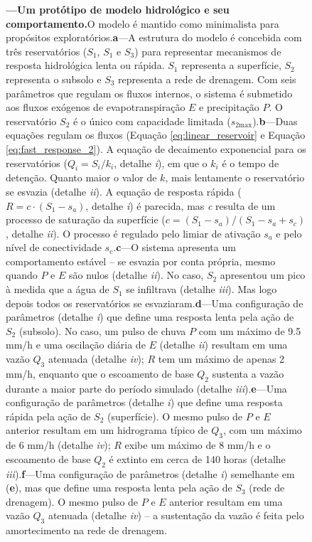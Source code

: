 \documentclass[./main.tex]{subfiles}
\begin{document}
\begin{figure}[t!]
	{\textbf{---\;Um protótipo de modelo hidrológico e seu comportamento.}\;O modelo é mantido como minimalista para propósitos exploratórios.\;\textbf{a}\;---\;A estrutura do modelo é concebida com três reservatórios ($S_1$, $S_1$ e $S_3$) para representar mecanismos de resposta hidrológica lenta ou rápida. $S_1$ representa a superfície, $S_2$ representa o subsolo e $S_3$ representa a rede de drenagem. Com seis parâmetros que regulam os fluxos internos, o sistema é submetido aos fluxos exógenos de evapotranspiração $E$ e precipitação $P$. O reservatório $S_2$ é o único com capacidade limitada ($s_\text{2max}$).\;\textbf{b}\;---\;Duas equações regulam os fluxos (Equação \eqref{eq:linear_reservoir} e Equação \eqref{eq:fast_response_2}). A equação de decaimento exponencial para os reservatórios ($Q_i = S_i/k_i$, detalhe \textrm{\textit{i}}), em que o $k_i$ é o tempo de detenção. Quanto maior o valor de $k$, mais lentamente o reservatório se esvazia (detalhe \textrm{\textit{ii}}). A equação de resposta rápida ($R = c\cdot (S_1 - s_a)$, detalhe \textrm{\textit{i}}) é parecida, mas \textit{c} resulta de um processo de saturação da superfície ($c = (S_1 - s_a)/(S_1 - s_a + s_c)$, detalhe \textrm{\textit{ii}}). O processo é regulado pelo limiar de ativação $s_a$ e pelo nível de conectividade $s_c$.\;\textbf{c}\;---\;O sistema apresenta um comportamento estável -- se esvazia por conta própria, mesmo quando $P$ e $E$ são nulos (detalhe \textrm{\textit{ii}}). No caso, $S_2$ apresentou um pico à medida que a água de $S_1$ se infiltrava (detalhe \textrm{\textit{iii}}). Mas logo depois todos os reservatórios se esvaziaram.\;\textbf{d}\;---\;Uma configuração de parâmetros (detalhe \textrm{\textit{i}}) que define uma resposta lenta pela ação de $S_2$ (subsolo). No caso, um pulso de chuva $P$ com um máximo de 9.5 mm/h e uma oscilação diária de $E$ (detalhe \textrm{\textit{ii}}) resultam em uma vazão $Q_3$ atenuada (detalhe \textrm{\textit{iv}}); $R$ tem um máximo de apenas 2 mm/h, enquanto que o escoamento de base $Q_2$ sustenta a vazão durante a maior parte do período simulado (detalhe \textrm{\textit{iii}}).\;\textbf{e}\;---\;Uma configuração de parâmetros (detalhe \textrm{\textit{i}}) que define uma resposta rápida pela ação de $S_2$ (superfície). O mesmo pulso de $P$ e $E$ anterior resultam em um hidrograma típico de $Q_3$, com um máximo de 6 mm/h (detalhe \textrm{\textit{iv}}); $R$ exibe um máximo de 8 mm/h e o escoamento de base $Q_2$ é extinto em cerca de 140 horas (detalhe \textrm{\textit{iii}}).\;\textbf{f}\;---\;Uma configuração de parâmetros (detalhe \textrm{\textit{i}}) semelhante em (\textbf{e}), mas que define uma resposta lenta pela ação de $S_3$ (rede de drenagem). O mesmo pulso de $P$ e $E$ anterior resultam em uma vazão $Q_3$ atenuada (detalhe \textrm{\textit{iv}}) -- a sustentação da vazão é feita pelo amortecimento na rede de drenagem.
	}
\label{fig:sys:proto}  %
\end{figure}
\end{document}
